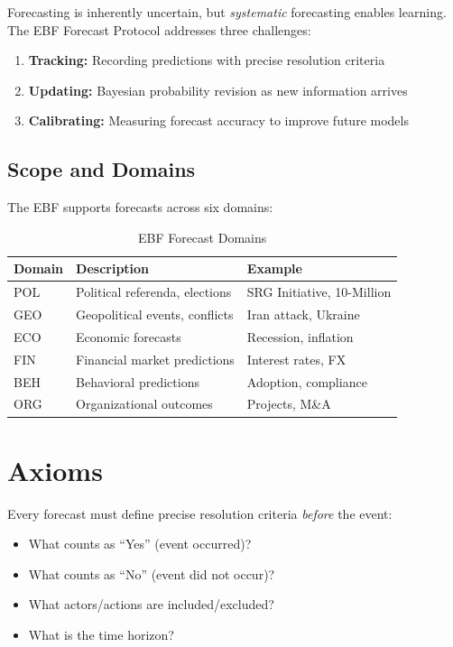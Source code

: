 Forecasting is inherently uncertain, but \textit{systematic} forecasting enables learning. The EBF Forecast Protocol addresses three challenges:

\begin{enumerate}
    \item \textbf{Tracking:} Recording predictions with precise resolution criteria
    \item \textbf{Updating:} Bayesian probability revision as new information arrives
    \item \textbf{Calibrating:} Measuring forecast accuracy to improve future models
\end{enumerate}

\subsection{Scope and Domains}

The EBF supports forecasts across six domains:

\begin{table}[h]
\centering
\begin{tabular}{lll}
\toprule
\textbf{Domain} & \textbf{Description} & \textbf{Example} \\
\midrule
POL & Political referenda, elections & SRG Initiative, 10-Million \\
GEO & Geopolitical events, conflicts & Iran attack, Ukraine \\
ECO & Economic forecasts & Recession, inflation \\
FIN & Financial market predictions & Interest rates, FX \\
BEH & Behavioral predictions & Adoption, compliance \\
ORG & Organizational outcomes & Projects, M\&A \\
\bottomrule
\end{tabular}
\caption{EBF Forecast Domains}
\label{tab:forecast-domains}
\end{table}

\section{Axioms}
\label{sec:fct-axioms}

\begin{axiom}
\label{ax:fct-1}
Every forecast must define precise resolution criteria \textit{before} the event:
\begin{itemize}
    \item What counts as ``Yes'' (event occurred)?
    \item What counts as ``No'' (event did not occur)?
    \item What actors/actions are included/excluded?
    \item What is the time horizon?
\end{itemize}
\end{axiom}

